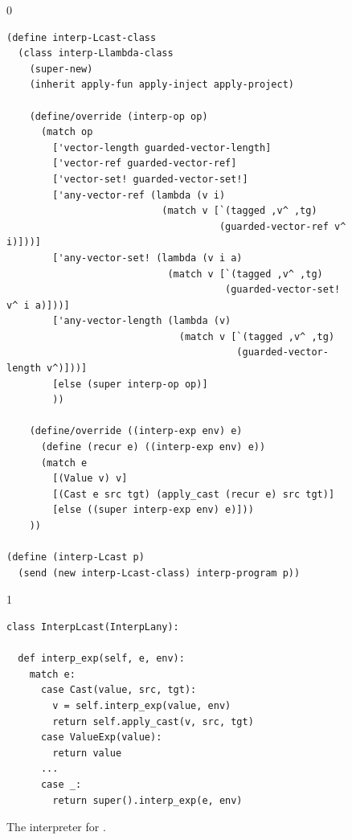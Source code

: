 \documentclass[7x10]{TimesAPriori_MIT}%
\def\racketEd{0}
\def\pythonEd{1}
\def\edition{1}
\newcommand{\pythonColor}[0]{}
\numberwithin{theorem}{chapter}
\numberwithin{definition}{chapter}
\numberwithin{equation}{chapter}
\begin{document}
\begin{figure}[tbp]
\begin{tcolorbox}[colback=white]  
{\if\edition\racketEd    
\begin{lstlisting}[basicstyle=\ttfamily\footnotesize]
(define interp-Lcast-class
  (class interp-Llambda-class
    (super-new)
    (inherit apply-fun apply-inject apply-project)

    (define/override (interp-op op)
      (match op
        ['vector-length guarded-vector-length]
        ['vector-ref guarded-vector-ref]
        ['vector-set! guarded-vector-set!]
        ['any-vector-ref (lambda (v i)
                           (match v [`(tagged ,v^ ,tg)
                                     (guarded-vector-ref v^ i)]))]
        ['any-vector-set! (lambda (v i a)
                            (match v [`(tagged ,v^ ,tg)
                                      (guarded-vector-set! v^ i a)]))]
        ['any-vector-length (lambda (v)
                              (match v [`(tagged ,v^ ,tg)
                                        (guarded-vector-length v^)]))]
        [else (super interp-op op)]
        ))

    (define/override ((interp-exp env) e)
      (define (recur e) ((interp-exp env) e))
      (match e
        [(Value v) v]
        [(Cast e src tgt) (apply_cast (recur e) src tgt)]
        [else ((super interp-exp env) e)]))
    ))

(define (interp-Lcast p)
  (send (new interp-Lcast-class) interp-program p))
\end{lstlisting}
\fi}
{\if\edition\pythonEd\pythonColor
\begin{lstlisting}[basicstyle=\ttfamily\footnotesize]
class InterpLcast(InterpLany):

  def interp_exp(self, e, env):
    match e:
      case Cast(value, src, tgt):
        v = self.interp_exp(value, env)
        return self.apply_cast(v, src, tgt)
      case ValueExp(value):
        return value
      ...
      case _:
        return super().interp_exp(e, env)
\end{lstlisting}
\fi}
\end{tcolorbox}

\caption{The interpreter for \LangCast{}.}
  \label{fig:interp-Lcast}
\end{figure}
\end{document}
